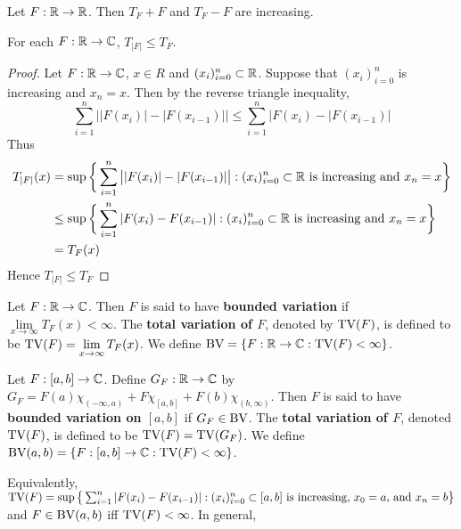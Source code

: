\documentclass{book}
\begin{document}
	\begin{lem}
		Let $F:\mathbb{R} \rightarrow \mathbb{R}$. Then $T_F+F$ and $T_F-F$ are increasing.
	\end{lem}
	
	\begin{ex}  
		For each $F:\mathbb{R} \rightarrow \mathbb{C}$, $T_{|F|} \leq T_F$.
	\end{ex}
	
	\begin{proof}
		Let $F:\mathbb{R} \rightarrow \mathbb{C}$, $x \in R$ and $(x_i)_{i=0}^n \subset \mathbb{R}$. Suppose that $(x_i)_{i=0}^n$ is increasing and $x_n=x$. Then by the reverse triangle inequality, $$ \sum_{i=1}^n\big||F(x_i)|-|F(x_{i-1})|\big|
		\leq \sum_{i=1}^n\big|F(x_i)-|F(x_{i-1})\big|$$
		Thus 
		\begin{align*}
			T_{|F|}(x) 
			&= \sup\bigg \{\sum_{i=1}^{n}\big||F(x_{i})| - |F(x_{i-1})|\big|: (x_i)_{i=0}^n \subset \mathbb{R} \text{ is increasing and } x_n=x  \bigg \} \\
			& \leq \sup\bigg \{\sum_{i=1}^{n}|F(x_{i}) - F(x_{i-1})|: (x_i)_{i=0}^n \subset \mathbb{R} \text{ is increasing and } x_n=x  \bigg \} \\
			&= T_F(x)
		\end{align*}
		Hence $T_{|F|} \leq T_F$
	\end{proof}
	
	\begin{defn}  
		Let $F:\mathbb{R} \rightarrow \mathbb{C}$. Then $F$ is said to have \textbf{bounded variation} if $\lim \limits_{x \rightarrow \infty}T_F(x)<\infty$. The \textbf{total variation of $F$}, denoted by $\text{TV}(F)$, is defined to be $\text{TV}(F) = \lim\limits_{x\rightarrow \infty}T_F(x)$.
		We define $\text{BV} = \{F:\mathbb{R} \rightarrow \mathbb{C}: \text{TV}(F)<\infty \}$.
	\end{defn}
	
	\begin{defn}  
		Let $F:[a,b] \rightarrow \mathbb{C}$. Define $G_F:\mathbb{R} \rightarrow \mathbb{C}$ by $G_F = F(a)\chi_{(-\infty,a)} + F\chi_{[a,b]}+F(b)\chi_{(b,\infty)}$. Then $F$ is said to have \textbf{bounded variation on $[a,b]$} if $G_F \in \text{BV}$. The \textbf{total variation of $F$}, denoted $\text{TV}(F)$, is defined to be $\text{TV}(F) = \text{TV}(G_F)$. We define $\text{BV}(a,b) = \{F:[a,b] \rightarrow \mathbb{C}: \text{TV}(F) < \infty\}$.
	\end{defn}
	
	\begin{note}
		Equivalently, $\text{TV}(F) = \sup \big \{\sum_{i=1}^{n}|F(x_{i}) - F(x_{i-1})|: (x_i)_{i=0}^n \subset [a,b] \text{ is increasing, } x_0=a \text{, and } x_n=b\big \}$ and $F \in \text{BV}(a,b)$ iff $\text{TV}(F) < \infty$. In general, 
	\end{note}
	
\end{document}
